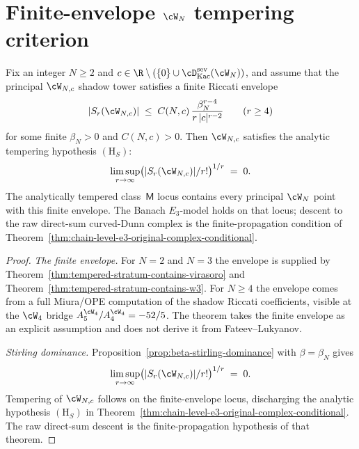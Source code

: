 \section{Finite-envelope $\cW_N$ tempering criterion}
\label{sec:wn-tempering}

\begin{theorem}
\label{thm:wn-tempered-all-N}
\ClaimStatusConditional
Fix an integer $N \ge 2$ and
$c \in \R \setminus (\{0\} \cup \cD^{\mathrm{sev}}_{\mathrm{Kac}}(\cW_N))$,
and assume that the principal $\cW_{N,c}$ shadow tower satisfies a
finite Riccati envelope
\[
 \lvert S_r(\cW_{N,c}) \rvert
 \;\le\;
 C(N,c)\,\frac{\beta_N^{r-4}}{r\,|c|^{r-2}}
 \qquad (r\ge 4)
\]
for some finite $\beta_N>0$ and $C(N,c)>0$. Then
$\cW_{N,c}$ satisfies the analytic tempering hypothesis
$(\mathrm{H}_S)$:
\[
 \limsup_{r \to \infty}
 \bigl( \lvert S_r(\cW_{N,c}) \rvert / r! \bigr)^{1/r}
 \;=\;
 0.
\]
The analytically tempered class~$\mathsf M$ locus contains every
principal $\cW_N$ point with this finite envelope. The Banach
$E_3$-model holds on that locus; descent to the raw direct-sum
curved-Dunn complex is the finite-propagation condition of
Theorem~\ref{thm:chain-level-e3-original-complex-conditional}.
\end{theorem}

\begin{proof}
\emph{The finite envelope.}
For $N=2$ and $N=3$ the envelope is supplied by
Theorem~\ref{thm:tempered-stratum-contains-virasoro} and
Theorem~\ref{thm:tempered-stratum-contains-w3}. For $N\ge4$ the
envelope comes from a full Miura/OPE computation of the shadow
Riccati coefficients, visible at the $\cW_4$ bridge
$A_5^{\cW_4}/A_4^{\cW_4}=-52/5$. The theorem takes the finite
envelope as an explicit assumption and does not derive it from
Fateev--Lukyanov.

\emph{Stirling dominance.}
Proposition~\ref{prop:beta-stirling-dominance} with
$\beta = \beta_N$ gives
\[
 \limsup_{r \to \infty}
 \bigl( \lvert S_r(\cW_{N,c}) \rvert / r! \bigr)^{1/r}
 \;=\;
 0.
\]
Tempering of $\cW_{N,c}$ follows on the finite-envelope locus,
discharging the analytic hypothesis $(\mathrm{H}_S)$ in
Theorem~\ref{thm:chain-level-e3-original-complex-conditional}. The
raw direct-sum descent is the finite-propagation hypothesis of that
theorem.
\end{proof}

